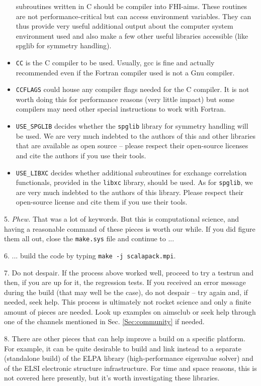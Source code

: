 \begin{itemize}
    subroutines written in C should be compiler into FHI-aims. These
    routines are not performance-critical but can access environment
    variables. They can thus provide very useful additional output
    about the computer system environment used and also make a few
    other useful libraries accessible (like spglib for symmetry
    handling).
  \item \texttt{CC} is the C compiler to be used. Usually, gcc is fine
    and actually recommended even if the Fortran compiler used is not
    a Gnu compiler.
  \item \texttt{CCFLAGS} could house any compiler flags needed for the
    C compiler. It is not worth doing this for performance reasons
    (very little impact) but some compilers may need other special
    instructions to work with Fortran.
  \item \texttt{USE\_SPGLIB} decides whether the \texttt{spglib}
    library for symmetry handling will be used. We are very much
    indebted to the authors of this and other libraries that are
    available as open source -- please respect their open-source
    licenses and cite the authors if you use their tools.
  \item \texttt{USE\_LIBXC} decides whether additional subroutines for
    exchange correlation functionals, provided in the \texttt{libxc}
    library, should be used. As for \texttt{spglib}, we are very much
    indebted to the authors of this library. Please respect their
    open-source license and cite them if you use their tools.
\end{itemize}

5. \textit{Phew.} That was a lot of keywords. But this is computational
science, and having a reasonable command of these pieces is worth our
while. If you did figure them all out, close the \texttt{make.sys}
file and continue to ...

6. ... build the code by typing \texttt{make -j scalapack.mpi}.

7. Do not despair. If the process above worked well, proceed to try a
testrun and then, if you are up for it, the regression tests. If you received an error  
message during the build (that may well be the case), do not despair
-- try again and, if needed, seek help. This process is ultimately not
rocket science and only a finite amount of pieces are needed. Look up
examples on aimsclub or seek help through one of the channels
mentioned in Sec. \ref{Sec:community} if needed.

8. There are other pieces that can help improve a build on a specific
platform. For example, it can be quite desirable to build and link
instead to a separate (standalone build) of the ELPA library
(high-performance eigenvalue solver) and of the ELSI electronic
structure infrastructure. For time and space reasons, this is not
covered here presently, but it's worth investigating these libraries.

